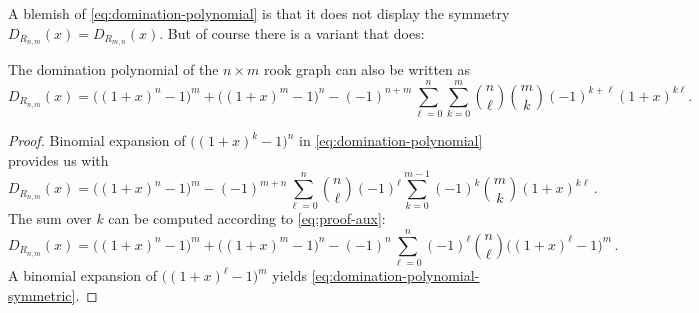 \documentclass[12pt,reqno]{article}
\begin{document}
  A blemish of \eqref{eq:domination-polynomial} is that it does not
  display the symmetry $D_{R_{n,m}}(x) = D_{R_{m,n}}(x)$. But of
  course there is a variant that does:
  \begin{corollary} \label{cor:domination-polynomial}
  The domination polynomial of the $n\times m$ rook graph can also be
  written as
  \begin{equation}
    \label{eq:domination-polynomial-symmetric}
    D_{R_{n,m}}(x) = \big((1+x)^n-1\big)^m+\big((1+x)^m-1\big)^n- (-1)^{n+m}
    \sum_{\ell=0}^n \sum_{k=0}^m {n \choose \ell} {m \choose k} (-1)^{k+\ell}(1+x)^{k\ell}\!.
  \end{equation}
\end{corollary}
\begin{proof}
  Binomial expansion of $\big((1+x)^k-1\big)^{n}$ in
   \eqref{eq:domination-polynomial} provides us with
   \begin{equation}
     \label{eq:proof-6}
     D_{R_{n,m}}(x) = \big((1+x)^n-1\big)^m  - (-1)^{m+n} \sum_{\ell =
       0}^n{n \choose \ell} (-1)^\ell\sum_{k=0}^{m-1}
     (-1)^{k}{m \choose k}(1+x)^{k\ell}\,.
   \end{equation}
   The sum over $k$ can be computed according to \eqref{eq:proof-aux}:
   \begin{equation}
     \label{eq:proof-7}
      D_{R_{n,m}}(x) = \big((1+x)^n -1\big)^m + \big((1+x)^m-1\big)^n - (-1)^n
    \sum_{\ell=0}^n(-1)^\ell{n \choose \ell} \big((1+x)^\ell-1\big)^m\,.
  \end{equation}
  A binomial expansion of $\big((1+x)^\ell-1\big)^m$ yields \eqref{eq:domination-polynomial-symmetric}.
\end{proof}
\end{document}
